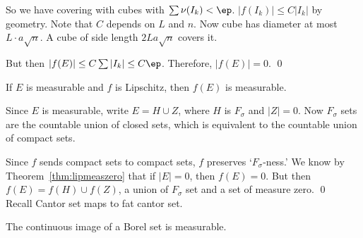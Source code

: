 So we have covering with cubes with $\sum \nu(I_k)<\ep$. $|f(I_k)| \leq C |I_k|$ by geometry. Note that $C$ depends on $L$ and $n$. Now cube has diameter at most $L \cdot a \sqrt{n}$. A cube of side length $2L a \sqrt{n}$ covers it. 


But then $|f(E)| \leq C \sum |I_k| \leq C\ep$. Therefore, $|f(E)|=0$. \qed \\


\begin{thm}
If $E$ is measurable and $f$ is Lipschitz, then $f(E)$ is measurable.
\end{thm}

\pf Since $E$ is measurable, write $E= H \cup Z$, where $H$ is $F_\sigma$ and $|Z|=0$. Now $F_\sigma$ sets are the countable union of closed sets, which is equivalent to the countable union of compact sets. 



Since $f$ sends compact sets to compact sets, $f$ preserves `$F_\sigma$-ness.' We know by Theorem~\ref{thm:lipmeaszero} that if $|E|=0$, then $f(E)=0$. But then $f(E)= f(H) \cup f(Z)$, a union of $F_\sigma$ set and a set of measure zero. \qed \\












Recall Cantor set maps to fat cantor set. 



\begin{thm}
The continuous image of a Borel set is measurable. 
\end{thm}



